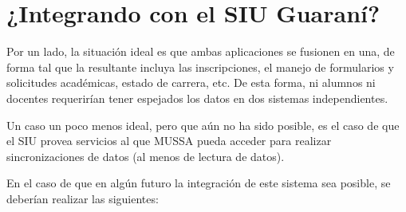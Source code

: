 \documentclass[a4paper]{article}
\begin{document}
\newpage
\section{¿Integrando con el SIU Guaraní?}

Por un lado, la situación ideal es que ambas aplicaciones se fusionen en una, de forma tal que la resultante incluya las inscripciones, el manejo de formularios y solicitudes académicas, estado de carrera, etc. De esta forma, ni alumnos ni docentes requerirían tener espejados los datos en dos sistemas independientes.

Un caso un poco menos ideal, pero que aún no ha sido posible, es el caso de que el SIU provea servicios al que MUSSA pueda acceder para realizar sincronizaciones de datos (al menos de lectura de datos).

En el caso de que en algún futuro la integración de este sistema sea posible, se deberían realizar las siguientes:
\end{document}
